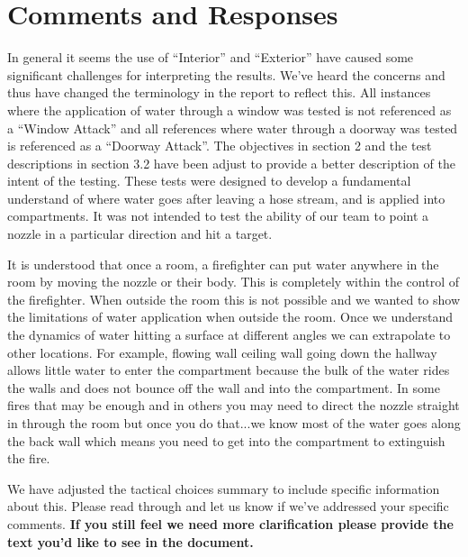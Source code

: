 \documentclass[12pt,oneside]{book}
\begin{document}
\newpage



\chapter*{Comments and Responses}
\label{comments}
In general it seems the use of ``Interior'' and ``Exterior'' have caused some significant challenges for interpreting the results. We've heard the concerns and thus have changed the terminology in the report to reflect this. All instances where the application of water through a window was tested is not referenced as a ``Window Attack'' and all references where water through a doorway was tested is referenced as a ``Doorway Attack''. The objectives in section 2 and the test descriptions in section 3.2 have been adjust to provide a better description of the intent of the testing. These tests were designed to develop a fundamental understand of where water goes after leaving a hose stream, and is applied into compartments. It was not intended to test the ability of our team to point a nozzle in a particular direction and hit a target. 

It is understood that once a room, a firefighter can put water anywhere in the room by moving the nozzle or their body.  This is completely within the control of the firefighter.  When outside the room this is not possible and we wanted to show the limitations of water application when outside the room. Once we understand the dynamics of water hitting a surface at different angles we can extrapolate to other locations.  For example, flowing wall ceiling wall going down the hallway allows little water to enter the compartment because the bulk of the water rides the walls and does not bounce off the wall and into the compartment.  In some fires that may be enough and in others you may need to direct the nozzle straight in through the room but once you do that...we know most of the water goes along the back wall which means you need to get into the compartment to extinguish the fire.   

We have adjusted the tactical choices summary to include specific information about this. Please read through and let us know if we've addressed your specific comments. \textbf{If you still feel we need more clarification please provide the text you'd like to see in the document.}
\end{document}

